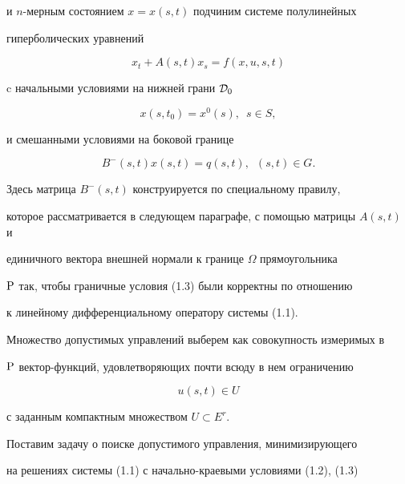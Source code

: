 и $n$-мерным состоянием $x = x(s,t)$ подчиним системе полулинейных


гиперболических уравнений


\begin{equation}


x_t + A(s,t)x_s = f(x,u,s,t)


\end{equation}


c начальными условиями на нижней грани ${\cal D}_0$


\begin{equation}


x(s,t_0) = x^0(s),\ \; s \in S,


\end{equation}


и смешанными условиями на боковой границе 


\begin{equation}


B^-(s,t)x(s,t) = q(s,t),\ \; (s,t) \in G.


\end{equation}


Здесь матрица $B^-(s,t)$ конструируется по специальному правилу,


которое рассматривается в следующем параграфе, с помощью матрицы $A(s,t)$ и


единичного вектора внешней нормали к границе $\Omega$ прямоугольника


$\P$ так, чтобы граничные условия (1.3) были корректны по отношению


к линейному дифференциальному оператору системы (1.1).





Множество допустимых управлений выберем как совокупность измеримых в


$\P$ вектор-функций, удовлетворяющих почти всюду в нем ограничению


\begin{equation}


u(s,t) \in U


\end{equation}


с заданным компактным множеством $U \subset E^r$.





Поставим задачу о поиске допустимого управления, минимизирующего


на решениях системы (1.1) с начально-краевыми условиями (1.2), (1.3)


